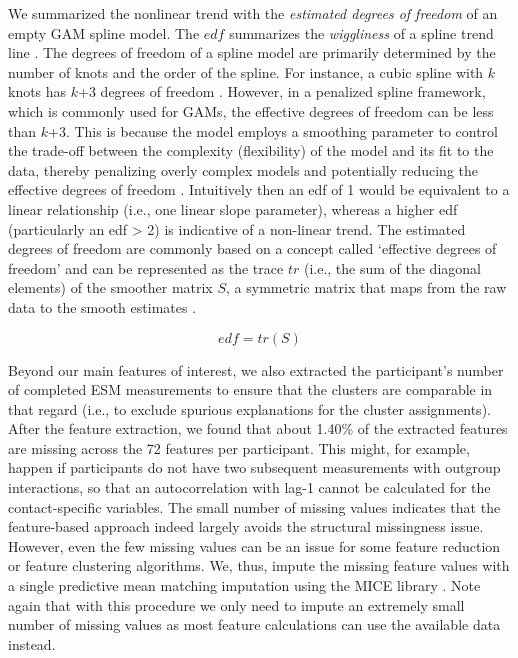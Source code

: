 \documentclass[man, 12pt, a4paper, floatsintext]{apa7}
\theoremstyle{break}
\theoremstyle{plain}
\begin{document}
We summarized the nonlinear trend with the
\textit{estimated degrees of freedom} of an empty GAM spline model. The
\(edf\) summarizes the \textit{wiggliness} of a spline trend line
\citep{wood2017}. The degrees of freedom of a spline model are primarily
determined by the number of knots and the order of the spline. For
instance, a cubic spline with \(k\) knots has \(k\)+3 degrees of freedom
\citep{faraway2016}. However, in a penalized spline framework, which is
commonly used for GAMs, the effective degrees of freedom can be less
than \(k\)+3. This is because the model employs a smoothing parameter to
control the trade-off between the complexity (flexibility) of the model
and its fit to the data, thereby penalizing overly complex models and
potentially reducing the effective degrees of freedom \citep{marx1998}.
Intuitively then an edf of 1 would be equivalent to a linear
relationship (i.e., one linear slope parameter), whereas a higher edf
(particularly an edf \textgreater{} 2) is indicative of a non-linear
trend. The estimated degrees of freedom are commonly based on a concept
called `effective degrees of freedom' and can be represented as the
trace \(tr\) (i.e., the sum of the diagonal elements) of the smoother
matrix \(S\), a symmetric matrix that maps from the raw data to the
smooth estimates \citep{wood2017}.

\begin{equation} \label{eq:df}
  edf = tr(S)
\end{equation}

Beyond our main features of interest, we also extracted the
participant's number of completed ESM measurements to ensure that the
clusters are comparable in that regard (i.e., to exclude spurious
explanations for the cluster assignments). After the feature extraction,
we found that about 1.40\% of the extracted features are missing across
the 72 features per participant. This might, for example, happen if
participants do not have two subsequent measurements with outgroup
interactions, so that an autocorrelation with lag-1 cannot be calculated
for the contact-specific variables. The small number of missing values
indicates that the feature-based approach indeed largely avoids the
structural missingness issue. However, even the few missing values can
be an issue for some feature reduction or feature clustering algorithms.
We, thus, impute the missing feature values with a single predictive
mean matching imputation using the MICE library \citep[][]{buuren2011}.
Note again that with this procedure we only need to impute an extremely
small number of missing values as most feature calculations can use the
available data instead.
\end{document}
